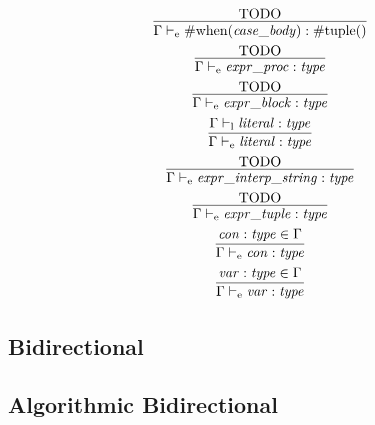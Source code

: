 \begin{gather*}
    \infer{\Gamma \vdash_\mathrm{e} \mathrm{\#when}(\mathit{case\_body}): \mathrm{\#tuple}()}{
        \text{TODO}
    }
    \\
    \infer{\Gamma \vdash_\mathrm{e} \mathit{expr\_proc}: \mathit{type}}{
        \text{TODO}
    }
    \\
    \infer{\Gamma \vdash_\mathrm{e} \mathit{expr\_block}: \mathit{type}}{
        \text{TODO}
    }
    \\
    \infer{\Gamma \vdash_\mathrm{e} \mathit{literal}: \mathit{type}}{
        \Gamma \vdash_\mathrm{l} \mathit{literal}: \mathit{type}
    }
    \\
    \infer{\Gamma \vdash_\mathrm{e} \mathit{expr\_interp\_string}: \mathit{type}}{
        \text{TODO}
    }
    \\
    \infer{\Gamma \vdash_\mathrm{e} \mathit{expr\_tuple}: \mathit{type}}{
        \text{TODO}
    }
    \\
    \infer{\Gamma \vdash_\mathrm{e} \mathit{con}: \mathit{type}}{
        \mathit{con}: \mathit{type} \in \Gamma
    }
    \\
    \infer{\Gamma \vdash_\mathrm{e} \mathit{var}: \mathit{type}}{
        \mathit{var}: \mathit{type} \in \Gamma
    }
\end{gather*}

\subsection{Bidirectional}

\subsection{Algorithmic Bidirectional}
